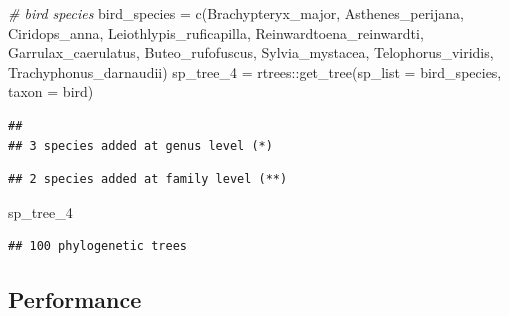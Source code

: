 \documentclass[
  12pt,
]{article}
\newenvironment{Shaded}{\begin{snugshade}}{\end{snugshade}}
\newcommand{\AttributeTok}[1]{\textcolor[rgb]{0.77,0.63,0.00}{#1}}
\newcommand{\CommentTok}[1]{\textcolor[rgb]{0.56,0.35,0.01}{\textit{#1}}}
\newcommand{\FunctionTok}[1]{\textcolor[rgb]{0.00,0.00,0.00}{#1}}
\newcommand{\NormalTok}[1]{#1}
\newcommand{\OtherTok}[1]{\textcolor[rgb]{0.56,0.35,0.01}{#1}}
\newcommand{\SpecialCharTok}[1]{\textcolor[rgb]{0.00,0.00,0.00}{#1}}
\newcommand{\StringTok}[1]{\textcolor[rgb]{0.31,0.60,0.02}{#1}}
\begin{document}
\begin{Shaded}
\begin{Highlighting}[]
\CommentTok{\# bird species}
\NormalTok{bird\_species }\OtherTok{=}  \FunctionTok{c}\NormalTok{(}\StringTok{\textquotesingle{}Brachypteryx\_major\textquotesingle{}}\NormalTok{, }\StringTok{\textquotesingle{}Asthenes\_perijana\textquotesingle{}}\NormalTok{, }\StringTok{\textquotesingle{}Ciridops\_anna\textquotesingle{}}\NormalTok{, }
                   \StringTok{\textquotesingle{}Leiothlypis\_ruficapilla\textquotesingle{}}\NormalTok{, }\StringTok{\textquotesingle{}Reinwardtoena\_reinwardti\textquotesingle{}}\NormalTok{,}
                   \StringTok{\textquotesingle{}Garrulax\_caerulatus\textquotesingle{}}\NormalTok{, }\StringTok{\textquotesingle{}Buteo\_rufofuscus\textquotesingle{}}\NormalTok{, }\StringTok{\textquotesingle{}Sylvia\_mystacea\textquotesingle{}}\NormalTok{,}
                   \StringTok{\textquotesingle{}Telophorus\_viridis\textquotesingle{}}\NormalTok{, }\StringTok{\textquotesingle{}Trachyphonus\_darnaudii\textquotesingle{}}\NormalTok{)}
\NormalTok{sp\_tree\_4 }\OtherTok{=}\NormalTok{ rtrees}\SpecialCharTok{::}\FunctionTok{get\_tree}\NormalTok{(}\AttributeTok{sp\_list =}\NormalTok{ bird\_species, }\AttributeTok{taxon =} \StringTok{\textquotesingle{}bird\textquotesingle{}}\NormalTok{)}
\end{Highlighting}
\end{Shaded}

\begin{verbatim}
## 
## 3 species added at genus level (*)
\end{verbatim}

\begin{verbatim}
## 2 species added at family level (**)
\end{verbatim}

\begin{Shaded}
\begin{Highlighting}[]
\NormalTok{sp\_tree\_4}
\end{Highlighting}
\end{Shaded}

\begin{verbatim}
## 100 phylogenetic trees
\end{verbatim}

\hypertarget{performance}{%
\subsection{Performance}\label{performance}}
\end{document}
